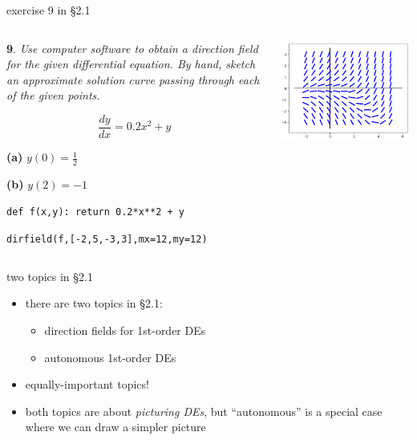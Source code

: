 \documentclass{beamer}
\begin{document}
\begin{frame}{exercise 9 in \S 2.1}

\begin{columns}
\begin{column}{0.45\textwidth}
\small
\noindent \textbf{9}.  \emph{Use computer software to obtain a direction field for the given differential equation.  By hand, sketch an approximate solution curve passing through each of the given points.}

$$\frac{dy}{dx} = 0.2 x^2 + y$$

\noindent \textbf{(a)} \quad $y(0)=\tfrac{1}{2}$

\noindent \textbf{(b)} \quad $y(2)=-1$

\vspace{15mm}

\scriptsize
\texttt{def f(x,y):  return 0.2*x**2 + y}

\texttt{dirfield(f,[-2,5,-3,3],mx=12,my=12)}
\end{column}
\begin{column}{0.55\textwidth}

\hspace{-10mm} \includegraphics[width=1.15\textwidth]{figs/exercise-9-2-1}
\end{column}
\end{columns}
\end{frame}


\begin{frame}{two topics in \S 2.1}

\begin{itemize}
\item there are two topics in \S 2.1:
    \begin{itemize}
    \item direction fields for 1st-order DEs
    \item autonomous 1st-order DEs
    \end{itemize}
\item equally-important topics!
\item both topics are about \emph{picturing DEs}, but ``autonomous'' is a special case where we can draw a simpler picture
\end{itemize}
\end{frame}
\end{document}

